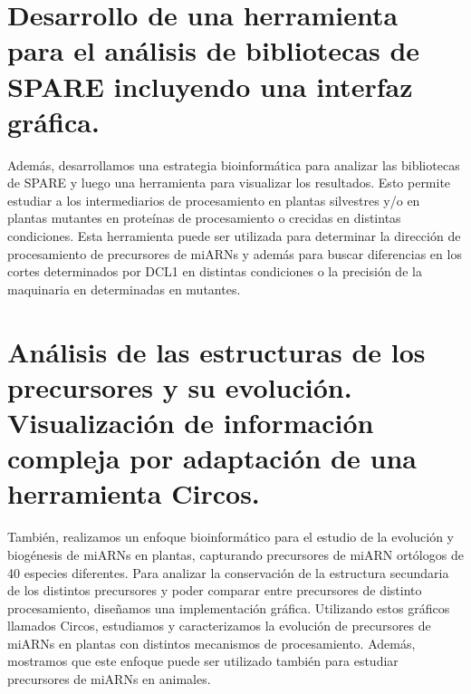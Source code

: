 \section{Desarrollo de una herramienta para el análisis de bibliotecas de SPARE incluyendo una interfaz gráfica.}

Además, desarrollamos una estrategia bioinformática  para analizar las bibliotecas de SPARE y luego una herramienta para visualizar los resultados.
Esto permite estudiar a los intermediarios de procesamiento en plantas silvestres y/o en plantas mutantes en proteínas de procesamiento o crecidas en distintas condiciones.
Esta herramienta puede ser utilizada para determinar la dirección de procesamiento de precursores de miARNs y además para buscar diferencias en los cortes determinados por DCL1 en distintas condiciones o la precisión de la maquinaria en determinadas en mutantes.

\section{Análisis de las estructuras de los precursores y su evolución. Visualización de información compleja por adaptación de una herramienta Circos.}

También, realizamos un enfoque bioinformático para el estudio de la evolución y biogénesis de miARNs en plantas, capturando precursores de miARN ortólogos de 40 especies diferentes.
Para analizar la conservación de la estructura secundaria de los distintos precursores y poder comparar entre precursores de distinto procesamiento, diseñamos una implementación gráfica.
Utilizando estos gráficos llamados Circos, estudiamos y caracterizamos la evolución de precursores de miARNs en plantas con distintos mecanismos de procesamiento.
Además, mostramos que este enfoque puede ser utilizado también para estudiar precursores de miARNs en animales.
